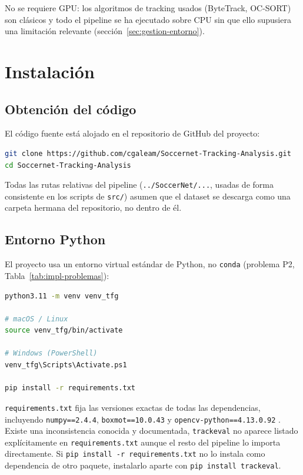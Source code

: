No se requiere GPU: los algoritmos de tracking usados (ByteTrack, OC-SORT)
son clásicos y todo el pipeline se ha ejecutado sobre CPU sin que ello
supusiera una limitación relevante (sección~\ref{sec:gestion-entorno}).

\section{Instalación}
\label{sec:manual-instalacion}

\subsection{Obtención del código}

El código fuente está alojado en el repositorio de GitHub del proyecto:

\begin{lstlisting}[language=bash]
git clone https://github.com/cgaleam/Soccernet-Tracking-Analysis.git
cd Soccernet-Tracking-Analysis
\end{lstlisting}

Todas las rutas relativas del pipeline (\texttt{../SoccerNet/...}, usadas de
forma consistente en los scripts de \texttt{src/}) asumen que el dataset se
descarga como una carpeta hermana del repositorio, no dentro de él.

\subsection{Entorno Python}
\label{subsec:manual-venv}

El proyecto usa un entorno virtual estándar de Python, no \texttt{conda}
(problema P2, Tabla~\ref{tab:impl-problemas}):

\begin{lstlisting}[language=bash]
python3.11 -m venv venv_tfg

# macOS / Linux
source venv_tfg/bin/activate

# Windows (PowerShell)
venv_tfg\Scripts\Activate.ps1

pip install -r requirements.txt
\end{lstlisting}

\texttt{requirements.txt} fija las versiones exactas de todas las
dependencias, incluyendo \texttt{numpy==2.4.4}, \texttt{boxmot==10.0.43} y
\texttt{opencv-python==4.13.0.92}
. Existe una inconsistencia
conocida y documentada, \texttt{trackeval} no aparece listado explícitamente en
\texttt{requirements.txt} aunque el resto del pipeline lo importa
directamente. Si \texttt{pip install -r requirements.txt} no lo instala
como dependencia de otro paquete, instalarlo aparte con
\texttt{pip install trackeval}.

